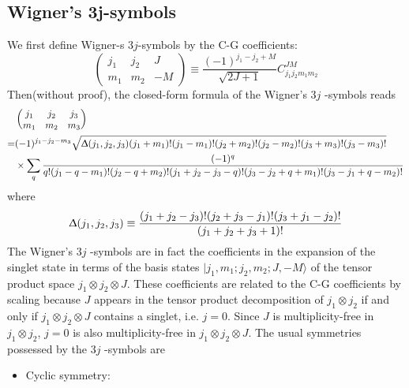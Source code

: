 \documentclass{article}
\begin{document}
	\subsection{Wigner’s 3j-symbols}
	
	We first define Wigner-s $3j$-symbols by the C-G coefficients:
	\begin{equation*}
		\begin{pmatrix}
			j_{1} & j_{2} & J\\
			m_{1} & m_{2} & -M
		\end{pmatrix} \equiv \frac{( -1)^{j_{1} -j_{2} +M}}{\sqrt{2J+1}} C_{j_{1} j_{2} m_{1} m_{2}}^{JM}
	\end{equation*}
	Then(without proof), the closed-form formula of the Wigner's $3j$ -symbols reads
	\begin{equation*}
		\begin{aligned}
			& \left(\begin{matrix}
				j_{1} & j_{2} & j_{3}\\
				m_{1} & m_{2} & m_{3}
			\end{matrix}\right)\\
			= & (-1)^{j_{1} -j_{2} -m_{3}}\sqrt{\Updelta ( j_{1} ,j_{2} ,j_{3})( j_{1} +m_{1}) !( j_{1} -m_{1}) !( j_{2} +m_{2}) !( j_{2} -m_{2}) !( j_{3} +m_{3}) !( j_{3} -m_{3}) !}\\
			& \times \sum _{q}\frac{(-1)^{q}}{q!( j_{1} -q-m_{1}) !( j_{2} -q+m_{2}) !( j_{1} +j_{2} -j_{3} -q) !( j_{3} -j_{2} +q+m_{1}) !( j_{3} -j_{1} +q-m_{2}) !}
		\end{aligned}
	\end{equation*}
	where
	\begin{equation*}
		\Updelta ( j_{1} ,j_{2} ,j_{3}) \equiv \frac{( j_{1} +j_{2} -j_{3}) !( j_{2} +j_{3} -j_{1}) !( j_{3} +j_{1} -j_{2}) !}{( j_{1} +j_{2} +j_{3} +1) !}
	\end{equation*}
	The Wigner's $3j$ -symbols are in fact the coefficients in the expansion of the singlet state in terms of the basis states $| j_{1} ,m_{1} ;j_{2} ,m_{2} ;J,-M\rangle  $ of the tensor product space $j_{1} \otimes j_{2} \otimes J$. These coefficients are related to the C-G coefficients by scaling because $J$ appears in the tensor product decomposition of $j_{1} \otimes j_{2}$ if and only if $j_{1} \otimes j_{2} \otimes J$ contains a singlet, i.e. $j=0$. Since $J$ is multiplicity-free in $j_{1} \otimes j_{2}$, $j=0$ is also multiplicity-free in $j_{1} \otimes j_{2} \otimes J$. The usual symmetries possessed by the $3j$ -symbols are
	\begin{itemize}
		\item Cyclic symmetry:
	\end{itemize}
\end{document}
